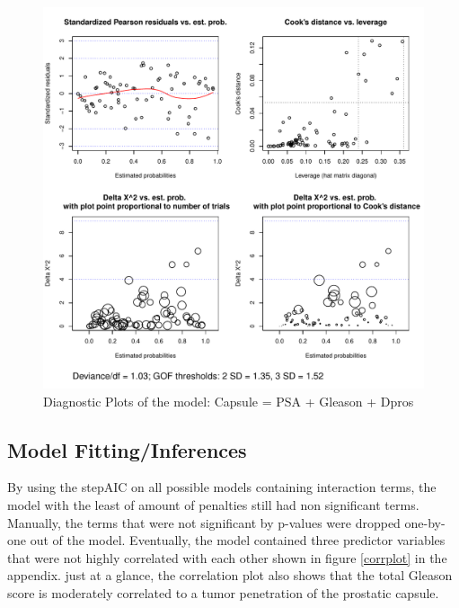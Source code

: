 \documentclass{article}\usepackage[]{graphicx}\usepackage[]{color}
\makeatletter
\def\maxwidth{ %
  \ifdim\Gin@nat@width>\linewidth
    \linewidth
  \else
    \Gin@nat@width
  \fi
}
\newenvironment{knitrout}{}{} %
\makeatother
\begin{document}
\begin{figure}
\caption{Diagnostic Plots of the model: Capsule = PSA + Gleason + Dpros}
\label{diagnostics}
\begin{knitrout}
\color{fgcolor}
\includegraphics[width=\maxwidth]{figure/Diagnostics_Charts-1} 

\end{knitrout}
\end{figure}

\subsection{Model Fitting/Inferences}
\qquad By using the stepAIC on all possible models containing interaction terms, the model with the least of amount of penalties still had non significant terms. Manually, the terms that were not significant by p-values were dropped one-by-one out of the model. Eventually, the model contained three predictor variables that were not highly correlated with each other shown in figure \ref{corrplot} in the appendix. just at a glance, the correlation plot also shows that the total Gleason score is moderately correlated to a tumor penetration of the prostatic capsule.
\end{document}
